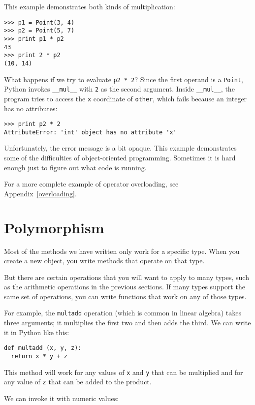 This example demonstrates both kinds of multiplication:

\beforeverb
\begin{verbatim}
>>> p1 = Point(3, 4)
>>> p2 = Point(5, 7)
>>> print p1 * p2
43
>>> print 2 * p2
(10, 14)
\end{verbatim}
\afterverb
%
What happens if we try to evaluate {\tt p2 * 2}?  Since
the first operand is a {\tt Point}, Python invokes
{\tt \_\_mul\_\_} with {\tt 2} as the second argument.
Inside {\tt \_\_mul\_\_}, the program tries to access the {\tt x}
coordinate of {\tt other}, which fails because
an integer has no attributes:

\beforeverb
\begin{verbatim}
>>> print p2 * 2
AttributeError: 'int' object has no attribute 'x'
\end{verbatim}
\afterverb
%
Unfortunately, the error message is a bit opaque.  This example
demonstrates some of the difficulties of object-oriented programming.
Sometimes it is hard enough just to figure out what code is running.

For a more complete example of operator overloading, see
Appendix~\ref{overloading}.


\section{Polymorphism}

Most of the methods we have written only work for a specific
type.  When you create a new object, you write methods that operate
on that type.

But there are certain operations that you will want to apply to many
types, such as the arithmetic operations in the previous sections.
If many types support the same set of operations, you
can write functions that work on any of those types.

For example, the {\tt multadd} operation (which is common in
linear algebra) takes three arguments; it multiplies the first
two and then adds the third.  We can write it in Python like
this:

\beforeverb
\begin{verbatim}
def multadd (x, y, z):
  return x * y + z
\end{verbatim}
\afterverb
%
This method will work for any values of {\tt x} and {\tt y}
that can be multiplied and for any value of {\tt z} that can be
added to the product.

We can invoke it with numeric values:

